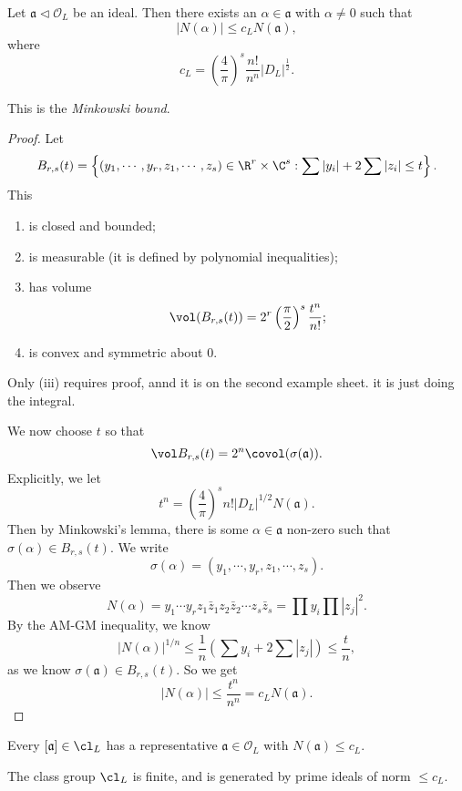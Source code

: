 \documentclass[a4paper]{article}
\begin{document}
\begin{prop}
  Let $\mathfrak{a} \lhd \mathcal{O}_L$ be an ideal. Then there exists an $\alpha \in \mathfrak{a}$ with $\alpha \not= 0$ such that
  \[
    |N(\alpha)| \leq c_L N(\mathfrak{a}),
  \]
  where
  \[
    c_L = \left(\frac{4}{\pi}\right)^s \frac{n!}{n^n} |D_L|^{\frac{1}{2}}.
  \]
\end{prop}
This is the \emph{Minkowski bound}.

\begin{proof}
  Let
  \[
    B_{r, s}(t) = \left\{(y_1, \cdots, y_r, z_1, \cdots, z_s) \in \R^r \times \C^s: \sum |y_i| + 2 \sum |z_i| \leq t\right\}.
  \]
  This
  \begin{enumerate}
    \item is closed and bounded;
    \item is measurable (it is defined by polynomial inequalities);
    \item has volume
      \[
        \vol(B_{r, s}(t)) = 2^r \left(\frac{\pi}{2}\right)^s \frac{t^n}{n!};
      \]
    \item is convex and symmetric about $0$.
  \end{enumerate}
  Only (iii) requires proof, annd it is on the second example sheet. it is just doing the integral.

  We now choose $t$ so that
  \[
    \vol B_{r, s}(t) = 2^n \covol(\sigma(\mathfrak{a})).
  \]
  Explicitly, we let
  \[
    t^n = \left(\frac{4}{\pi}\right)^s n! |D_L|^{1/2}N(\mathfrak{a}).
  \]
  Then by Minkowski's lemma, there is some $\alpha \in \mathfrak{a}$ non-zero such that $\sigma(\alpha) \in B_{r, s}(t)$. We write
  \[
    \sigma(\alpha) = (y_1, \cdots, y_r, z_1, \cdots, z_s).
  \]
  Then we observe
  \[
    N(\alpha) = y_1\cdots y_r z_1 \bar{z}_1 z_2 \bar{z}_2 \cdots z_s \bar{z}_s = \prod y_i \prod|z_j|^2.
  \]
  By the AM-GM inequality, we know
  \[
    |N(\alpha)|^{1/n} \leq \frac{1}{n}\left(\sum y_i + 2 \sum |z_j|\right) \leq \frac{t}{n},
  \]
  as we know $\sigma(\mathfrak{a}) \in B_{r, s}(t)$. So we get
  \[
    |N(\alpha)| \leq \frac{t^n}{n^n} = c_L N(\mathfrak{a}).
  \]
\end{proof}

\begin{cor}
  Every $[\mathfrak{a}] \in \cl_L$ has a representative $\mathfrak{a} \in \mathcal{O}_L$ with $N(\mathfrak{a}) \leq c_L$.
\end{cor}

\begin{thm}[Dirichlet]
  The class group $\cl_L$ is finite, and is generated by prime ideals of norm $\leq c_L$.
\end{thm}
\end{document}
